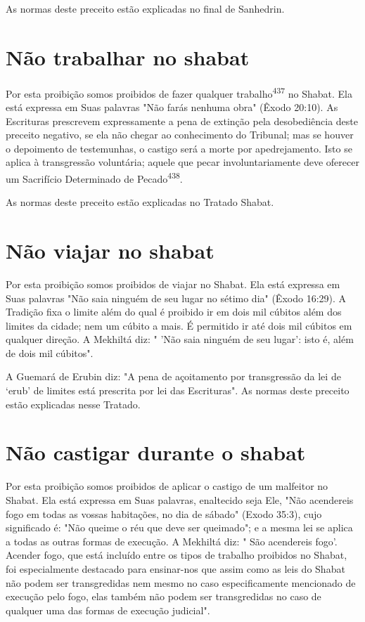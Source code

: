 \begin{itemize}
\begin{enumrate}
\begin{itemize}
\begin{itemize}
\begin{itemize}
As normas deste preceito estão explicadas no final de Sanhedrin.


\section{Não trabalhar no shabat}

Por esta proibição somos proibidos de fazer qualquer
trabalho\textsuperscript{437} no Shabat. Ela está expressa em Suas
palavras "Não farás nenhuma obra" (Êxodo 20:10). As Escrituras
prescrevem expressamente a pena de extinção pela deso­bediência deste
preceito negativo, se ela não chegar ao conhecimento do Tri­bunal; mas
se houver o depoimento de testemunhas, o castigo será a morte por
apedrejamento. Isto se aplica à transgressão voluntária; aquele que
pecar invo­luntariamente deve oferecer um Sacrifício Determinado de
Pecado\textsuperscript{438}.

As normas deste preceito estão explicadas no Tratado Shabat.

\section{Não viajar no shabat}

Por esta proibição somos proibidos de viajar no Shabat. Ela está
ex­pressa em Suas palavras "Não saia ninguém de seu lugar no sétimo dia"
(Êxodo 16:29). A Tradição fixa o limite além do qual é proibido ir em
dois mil cúbitos além dos limites da cidade; nem um cúbito a mais. É
permitido ir até dois mil cúbitos em qualquer direção. A Mekhiltá diz: "
'Não saia ninguém de seu lu­gar': isto é, além de dois mil cúbitos".

A Guemará de Erubin diz: "A pena de açoitamento por transgressão da lei
de `erub' de limites está prescrita por lei das Escrituras". As normas
deste preceito estão explicadas nesse Tratado.


\section{Não castigar durante o shabat}


Por esta proibição somos proibidos de aplicar o castigo de um mal­feitor
no Shabat. Ela está expressa em Suas palavras, enaltecido seja Ele, "Não
acendereis fogo em todas as vossas habitações, no dia de sábado" (Exodo
35:3), cujo significado é: "Não queime o réu que deve ser queimado"; e a
mesma lei se aplica a todas as outras formas de execução. A Mekhiltá
diz: " São acende­reis fogo'. Acender fogo, que está incluído entre os
tipos de trabalho proibidos no Shabat, foi especialmente destacado para
ensinar-nos que assim como as leis do Shabat não podem ser transgredidas
nem mesmo no caso especificamente mencionado de execução pelo fogo, elas
também não podem ser transgredidas no caso de qualquer uma das formas de
execução judicial".


\end{itemize}
\end{itemize}
\end{itemize}
\end{enumrate}
\end{itemize}
